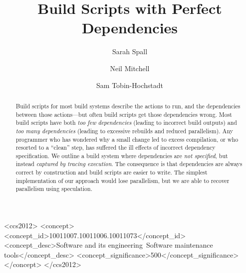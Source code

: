 \documentclass[acmsmall,screen,review,10pt]{acmart}
\begin{document}
\newcommand{\Make}{\textsc{Make}\xspace}
\newcommand{\Rattle}{\textsc{Rattle}\xspace}
\newcommand{\Fabricate}{\textsc{Fabricate}\xspace}
\newcommand{\Bazel}{\textsc{Bazel}\xspace}
\newcommand{\Buck}{\textsc{Buck}\xspace}
\newcommand{\Shake}{\textsc{Shake}\xspace}
\newcommand{\Bigbro}{\textsc{BigBro}\xspace}
\newcommand{\Fac}{\textsc{Fac}\xspace}
\newcommand{\Fsatrace}{\textsc{Fsatrace}\xspace}
\newcommand{\tracedfs}{\textsc{Traced-Fs}\xspace}
\newcommand{\BuildXL}{\textsc{BuildXL}\xspace}
\newcommand{\Nix}{\textsc{Nix}\xspace}
\newcommand{\Memoize}{\textsc{Memoize}\xspace}
\newcommand{\Stroll}{\textsc{Stroll}\xspace}
\newcommand{\Pluto}{\textsc{Pluto}\xspace}
\newcommand{\PIE}{\textsc{PIE}\xspace}

\newcommand{\postparagraphs}{\vspace{3mm}\noindent}


\title{Build Scripts with Perfect Dependencies}

\author{Sarah Spall}

\author{Neil Mitchell}

\author{Sam Tobin-Hochstadt}


\begin{abstract}
Build scripts for most build systems describe the actions to run, and the dependencies between those actions---but often build scripts get those dependencies wrong.
Most build scripts have both \emph{too few dependencies} (leading to incorrect build outputs) and \emph{too many dependencies} (leading to excessive rebuilds and reduced parallelism). Any programmer who has wondered why a small change led to excess compilation, or who resorted to a ``clean'' step, has suffered the ill effects of incorrect dependency specification.
We outline a build system where dependencies are \emph{not specified}, but instead \emph{captured by tracing execution}.
The consequence is that dependencies are always correct by construction and build scripts are easier to write.
The simplest implementation of our approach would lose parallelism, but we are able to recover parallelism using speculation.
\end{abstract}

\begin{CCSXML}
<ccs2012>
<concept>
<concept_id>10011007.10011006.10011073</concept_id>
<concept_desc>Software and its engineering~Software maintenance tools</concept_desc>
<concept_significance>500</concept_significance>
</concept>
</ccs2012>
\end{CCSXML}

\maketitle











\end{document}
